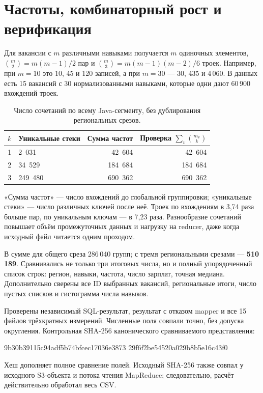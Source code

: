 \documentclass[11pt,a4paper]{article}
\begin{document}
\clearpage
\section{Частоты, комбинаторный рост и верификация}
Для вакансии с $m$ различными навыками получается $m$ одиночных элементов, $\binom m2=m(m-1)/2$ пар и $\binom m3=m(m-1)(m-2)/6$ троек. Например, при $m=10$ это 10, 45 и 120 записей, а при $m=30$ --- 30, 435 и 4\,060. В данных есть 15 вакансий с 30 нормализованными навыками, которые одни дают 60\,900 вхождений троек.
\begin{table}[h!]
\centering\small
\caption{Число сочетаний по всему Java-сегменту, без дублирования региональных срезов.}
\begin{tabularx}{\linewidth}{rXrr}\toprule
$k$ & Уникальные стеки & Сумма частот & Проверка $\sum_v {m_v\choose k}$\\\midrule
1 & 2~031 & 42~604 & 42~604\\
2 & 34~529 & 184~684 & 184~684\\
3 & 249~480 & 690~362 & 690~362\\
\bottomrule\end{tabularx}
\end{table}

«Сумма частот» --- число вхождений до глобальной группировки; «уникальные стеки» --- число различных ключей после неё. Троек по вхождениям в 3,74 раза больше пар, по уникальным ключам --- в 7,23 раза. Разнообразие сочетаний повышает объём промежуточных данных и нагрузку на reducer, даже когда исходный файл читается одним проходом.

В сумме для общего среза 286\,040 групп; с тремя региональными срезами --- \textbf{510\,189}. Сравнивались не только три итоговых числа, но и полный упорядоченный список строк: регион, навыки, частота, число зарплат, точная медиана. Дополнительно сверены все ID выбранных вакансий, региональные итоги, число пустых списков и гистограмма числа навыков.
Проверены независимый SQL-результат, результат с отказом mapper и все 15 файлов трёхкратных измерений. Численные поля совпали точно, без допуска округления. Контрольная SHA-256 канонического сравниваемого представления:
\begin{terminal}
9b30b39115c94adf5b74bfcec17036e3873
29f6f2be54520a029b8b5e16c43f0
\end{terminal}
Хеш дополняет полное сравнение полей. Исходный SHA-256 также совпал у исходного S3-объекта и потока чтения MapReduce; следовательно, расчёт действительно обработал весь CSV.
\end{document}
